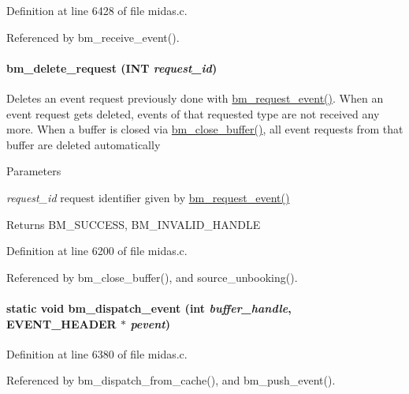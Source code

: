 Definition at line 6428 of file midas.c.

Referenced by bm\_\-receive\_\-event().
\paragraph[{bm\_\-delete\_\-request}]{ bm\_\-delete\_\-request ({\bf INT} {\em request\_\-id})}\hfill\label{group__bmfunctionc_ga33221a55f8c90e411dea5eb34a2ee773}
Deletes an event request previously done with \hyperlink{group__bmfunctionc_gabf663d96482aeede1846487a7ada8184}{bm\_\-request\_\-event()}. When an event request gets deleted, events of that requested type are not received any more. When a buffer is closed via \hyperlink{group__bmfunctionc_ga7b2cbde6caa572dfc978c780d63ab6be}{bm\_\-close\_\-buffer()}, all event requests from that buffer are deleted automatically 
\begin{DoxyParams}{Parameters}
\item[{\em request\_\-id}]request identifier given by \hyperlink{group__bmfunctionc_gabf663d96482aeede1846487a7ada8184}{bm\_\-request\_\-event()} \end{DoxyParams}
\begin{DoxyReturn}{Returns}
BM\_\-SUCCESS, BM\_\-INVALID\_\-HANDLE 
\end{DoxyReturn}


Definition at line 6200 of file midas.c.

Referenced by bm\_\-close\_\-buffer(), and source\_\-unbooking().
\paragraph[{bm\_\-dispatch\_\-event}]{\setlength{\rightskip}{0pt plus 5cm}static void bm\_\-dispatch\_\-event (int {\em buffer\_\-handle}, \/  {\bf EVENT\_\-HEADER} $\ast$ {\em pevent})}\hfill\label{group__bmfunctionc_gacc844625f422be4b21810748a2618783}


Definition at line 6380 of file midas.c.

Referenced by bm\_\-dispatch\_\-from\_\-cache(), and bm\_\-push\_\-event().
